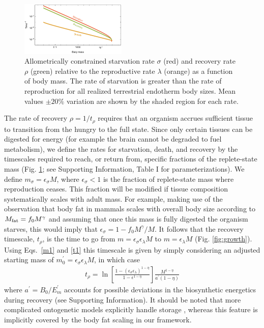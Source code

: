 \documentclass[twocolumn,preprintnumbers,amsmath,amssymb,superscriptaddress]{revtex4}
\begin{document}
\begin{figure}[ht]
\includegraphics[width=0.45\textwidth]{fig_Rates.pdf}
\caption{\small Allometrically constrained starvation rate $\sigma$ (red) and
  recovery rate $\rho$ (green) relative to the reproductive rate $\lambda$
  (orange) as a function of body mass.  The rate of starvation is greater
  than the rate of reproduction for all realized terrestrial endotherm body
  sizes.  Mean values $\pm 20\%$ variation are shown by the shaded region for
  each rate.  }
\label{fig:gvs}
\end{figure}


The rate of recovery $\rho = 1/t_\rho$ requires that an organism accrues
sufficient tissue to transition from the hungry to the full state.  Since
only certain tissues can be digested for energy (for example the brain cannot
be degraded to fuel metabolism), we define the rates for starvation, death,
and recovery by the timescales required to reach, or return from, specific
fractions of the replete-state mass (Fig. \ref{fig:gvs}; see Supporting
Information, Table I for parameterizations).  We define
$m_{\sigma}=\epsilon_{\sigma} M$, where $\epsilon_{\sigma}<1$ is the fraction
of replete-state mass where reproduction ceases. This fraction will be
modified if tissue composition systematically scales with adult mass.  For
example, making use of the observation that body fat in mammals scales with
overall body size according to $M_{\rm fat}=f_{0}M^{\gamma}$ and assuming
that once this mass is fully digested the organism starves, this would imply
that $\epsilon_{\sigma}=1-f_{0}M^{\gamma}/M$. It follows that the recovery
timescale, $t_{\rho}$, is the time to go from
$m=\epsilon_{\sigma} \epsilon_{\lambda} M$ to $m=\epsilon_{\lambda}M$
(Fig. \ref{fig:growth}). Using Eqs.~\eqref{m1} and \eqref{t1} this timescale
is given by simply considering an adjusted starting mass of
$m_{0}^{\prime}=\epsilon_{\sigma}\epsilon_{\lambda}M$, in which case
\begin{eqnarray}
t_{\rho}=\ln\left[\frac{1-\left(\epsilon_{\sigma}\epsilon_{\lambda}\right)^{1-\eta}}{1-\epsilon^{1-\eta}}\right]\frac{M^{1-\eta}}{a^{\prime}\left(1-\eta\right)}
\end{eqnarray}
where $a^{\prime}=B_{0}/E_{m}^{\prime}$ accounts for possible deviations in the biosynthetic energetics during recovery (see Supporting Information). It should be noted that more complicated ontogenetic models explicitly handle
storage \cite{hou}, whereas this feature is implicitly covered by the body
fat scaling in our framework.
\end{document}
